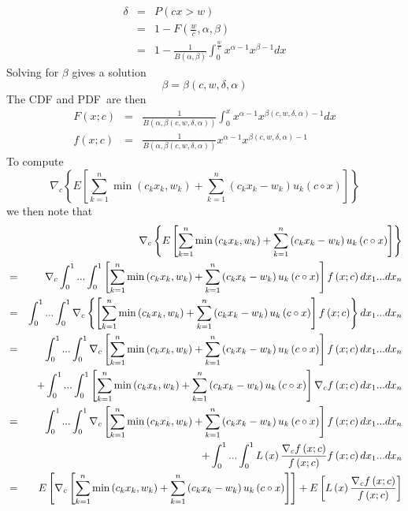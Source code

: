 \documentclass{article}
\begin{document}
\begin{eqnarray*}
\delta  &=&P\left( cx>w\right)  \\
&=&1-F\left( \frac{w}{c},\alpha ,\beta \right)  \\
&=&1-\frac{1}{B\left( \alpha ,\beta \right) }\int_{0}^{\frac{w}{c}}x^{\alpha
-1}x^{\beta -1}dx
\end{eqnarray*}%
Solving for $\beta $ gives a solution%
\[
\beta =\beta \left( c,w,\delta ,\alpha \right) 
\]%
The CDF and PDF\ are then%
\begin{eqnarray*}
F\left( x;c\right)  &=&\frac{1}{B\left( \alpha ,\beta \left( c,w,\delta
,\alpha \right) \right) }\int_{0}^{x}x^{\alpha -1}x^{\beta \left( c,w,\delta
,\alpha \right) -1}dx \\
f\left( x;c\right)  &=&\frac{1}{B\left( \alpha ,\beta \left( c,w,\delta
,\alpha \right) \right) }x^{\alpha -1}x^{\beta \left( c,w,\delta ,\alpha
\right) -1}
\end{eqnarray*}%
To compute 
\[
\nabla _{c}\left\{ E\left[ \sum_{k=1}^{n}\min \left( c_{k}x_{k},w_{k}\right)
+\sum_{k=1}^{n}\left( c_{k}x_{k}-w_{k}\right) u_{k}\left( c\circ x\right) %
\right] \right\} 
\]%
we then note that%
\begin{eqnarray*}
&&\nabla _{c}\left\{ E\left[ \sum_{k=1}^{n}\min \left(
c_{k}x_{k},w_{k}\right) +\sum_{k=1}^{n}\left( c_{k}x_{k}-w_{k}\right)
u_{k}\left( c\circ x\right) \right] \right\}  \\
&=&\nabla _{c}\int_{0}^{1}...\int_{0}^{1}\left[ \sum_{k=1}^{n}\min \left(
c_{k}x_{k},w_{k}\right) +\sum_{k=1}^{n}\left( c_{k}x_{k}-w_{k}\right)
u_{k}\left( c\circ x\right) \right] f\left( x;c\right) dx_{1}...dx_{n} \\
&=&\int_{0}^{1}...\int_{0}^{1}\nabla _{c}\left\{ \left[ \sum_{k=1}^{n}\min
\left( c_{k}x_{k},w_{k}\right) +\sum_{k=1}^{n}\left( c_{k}x_{k}-w_{k}\right)
u_{k}\left( c\circ x\right) \right] f\left( x;c\right) \right\}
dx_{1}...dx_{n} \\
&=&\int_{0}^{1}...\int_{0}^{1}\nabla _{c}\left[ \sum_{k=1}^{n}\min \left(
c_{k}x_{k},w_{k}\right) +\sum_{k=1}^{n}\left( c_{k}x_{k}-w_{k}\right)
u_{k}\left( c\circ x\right) \right] f\left( x;c\right) dx_{1}...dx_{n} \\
&&+\int_{0}^{1}...\int_{0}^{1}\left[ \sum_{k=1}^{n}\min \left(
c_{k}x_{k},w_{k}\right) +\sum_{k=1}^{n}\left( c_{k}x_{k}-w_{k}\right)
u_{k}\left( c\circ x\right) \right] \nabla _{c}f\left( x;c\right)
dx_{1}...dx_{n} \\
&=&\int_{0}^{1}...\int_{0}^{1}\nabla _{c}\left[ \sum_{k=1}^{n}\min \left(
c_{k}x_{k},w_{k}\right) +\sum_{k=1}^{n}\left( c_{k}x_{k}-w_{k}\right)
u_{k}\left( c\circ x\right) \right] f\left( x;c\right) dx_{1}...dx_{n} \\
&&+\int_{0}^{1}...\int_{0}^{1}L\left( x\right) \frac{\nabla _{c}f\left(
x;c\right) }{f\left( x;c\right) }f\left( x;c\right) dx_{1}...dx_{n} \\
&=&E\left[ \nabla _{c}\left[ \sum_{k=1}^{n}\min \left(
c_{k}x_{k},w_{k}\right) +\sum_{k=1}^{n}\left( c_{k}x_{k}-w_{k}\right)
u_{k}\left( c\circ x\right) \right] \right] +E\left[ L\left( x\right) \frac{%
\nabla _{c}f\left( x;c\right) }{f\left( x;c\right) }\right] 
\end{eqnarray*}%
\end{document}
